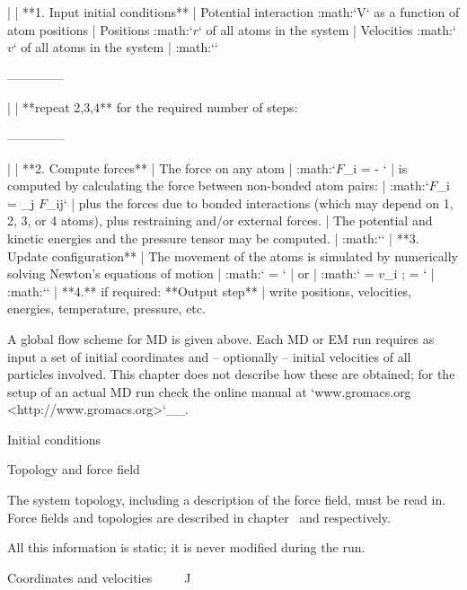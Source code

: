 | 
| **1. Input initial conditions**
| Potential interaction :math:`V` as a function of atom positions
| Positions :math:`{\mbox{\boldmath ${r}$}}` of all atoms in the system
| Velocities :math:`{\mbox{\boldmath ${v}$}}` of all atoms in the system
| :math:`\Downarrow`

--------------

| 
| **repeat 2,3,4** for the required number of steps:

--------------

| 
| **2. Compute forces**
| The force on any atom
| :math:`{\mbox{\boldmath ${F}$}}_i = - \displaystyle{}`
| is computed by calculating the force between non-bonded atom pairs:
| :math:`{\mbox{\boldmath ${F}$}}_i = \sum_j {\mbox{\boldmath ${F}$}}_{ij}`
| plus the forces due to bonded interactions (which may depend on 1, 2,
  3, or 4 atoms), plus restraining and/or external forces.
| The potential and kinetic energies and the pressure tensor may be
  computed.
| :math:`\Downarrow`
| **3. Update configuration**
| The movement of the atoms is simulated by numerically solving Newton’s
  equations of motion
| :math:`\displaystyle {} = `
| or
| :math:`\displaystyle   {} = {\mbox{\boldmath ${v}$}}_i ; \;\;    = ` 
| :math:`\Downarrow`
| **4.** if required: **Output step**
| write positions, velocities, energies, temperature, pressure, etc.

A global flow scheme for MD is given above.
Each MD or EM run requires as input
a set of initial coordinates and – optionally – initial velocities of
all particles involved. This chapter does not describe how these are
obtained; for the setup of an actual MD run check the online manual at
`www.gromacs.org <http://www.gromacs.org>`__.

Initial conditions
~~~~~~~~~~~~~~~~~~

Topology and force field
^^^^^^^^^^^^^^^^^^^^^^^^

The system topology, including a description of the force field, must be
read in. Force fields and topologies are described in
chapter 
and 
respectively.

All this information is static; it is never modified during the run.

Coordinates and velocities
^^^^^^^^^^^^^^^^^^^^^^^^^^

